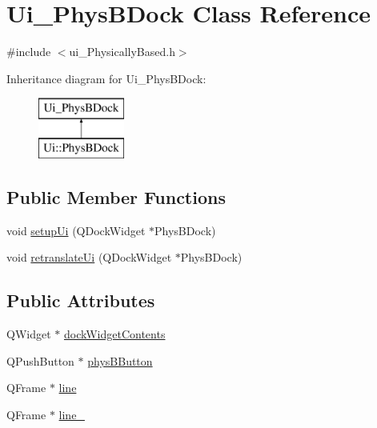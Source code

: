 \hypertarget{class_ui___phys_b_dock}{\section{Ui\-\_\-\-Phys\-B\-Dock Class Reference}
\label{class_ui___phys_b_dock}
}


{\ttfamily \#include $<$ui\-\_\-\-Physically\-Based.\-h$>$}

Inheritance diagram for Ui\-\_\-\-Phys\-B\-Dock\-:\begin{figure}[H]
\begin{center}
\leavevmode
\includegraphics[height=2.000000cm]{class_ui___phys_b_dock}
\end{center}
\end{figure}
\subsection*{Public Member Functions}
\begin{DoxyCompactItemize}
\item 
void \hyperlink{class_ui___phys_b_dock_a335ee69ced7a7c0402c18b55f5e8b2d0}{setup\-Ui} (Q\-Dock\-Widget $\ast$Phys\-B\-Dock)
\item 
void \hyperlink{class_ui___phys_b_dock_abc5108323e77b2e0a5ea5d18ae1c8f93}{retranslate\-Ui} (Q\-Dock\-Widget $\ast$Phys\-B\-Dock)
\end{DoxyCompactItemize}
\subsection*{Public Attributes}
\begin{DoxyCompactItemize}
\item 
Q\-Widget $\ast$ \hyperlink{class_ui___phys_b_dock_afb820b26a533843d9c568c6c91df0021}{dock\-Widget\-Contents}
\item 
Q\-Push\-Button $\ast$ \hyperlink{class_ui___phys_b_dock_a011f24bbe2ada22ad04c4da81c72c3b1}{phys\-B\-Button}
\item 
Q\-Frame $\ast$ \hyperlink{class_ui___phys_b_dock_ac5cc5c7e3a4d3c418afac6754b5e2824}{line}
\item 
Q\-Frame $\ast$ \hyperlink{class_ui___phys_b_dock_a37156c5e0a99eee9ffc0bbf3aae14289}{line\-\_}
\end{DoxyCompactItemize}


